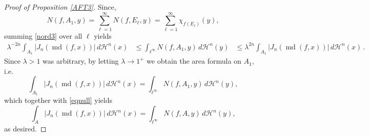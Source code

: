 \documentclass[12pt,leqno]{amsart}
\theoremstyle{definition}
\def\H{{\mathcal H}}
\def\md{\operatorname{md}}
\numberwithin{theorem}{section} \numberwithin{equation}{section}
\begin{document}
\begin{proof}[Proof of Proposition \ref{AFT3}]
Since,
$$
N(f,A_1,y)=\sum_{\ell=1}^\infty N(f,E_\ell,y)=\sum_{\ell=1}^\infty\chi_{f(E_\ell)}(y),
$$
summing \eqref{nord3} over all $\ell$ yields
\begin{align*}
   \lambda^{-2n}\int_{A_1} |J_n(\md(f,x))| \, d\H^n(x) &\leq  \int_{\ell^\infty} N(f,A_1,y)\, d\H^n(y)
   &\leq  \lambda^{2n} \int_{A_1} |J_n(\md(f,x))| \, d\H^n(x) \, .
\end{align*}
Since $\lambda>1$ was arbitrary, by letting $\lambda \to 1^+$ we obtain the area formula on $A_1$, i.e.\
$$
\int_{A_1} |J_n(\md(f,x))| \, d\H^n(x) = \int_{\ell^\infty} N(f,A_1,y)\, d\H^n(y),
$$
which together with \eqref{eqnull} yields
$$
\int_{A} |J_n(\md(f,x))| \, d\H^n(x) = \int_{\ell^\infty} N(f,A,y)\, d\H^n(y),
$$
as desired.
\end{proof}
\end{document}
